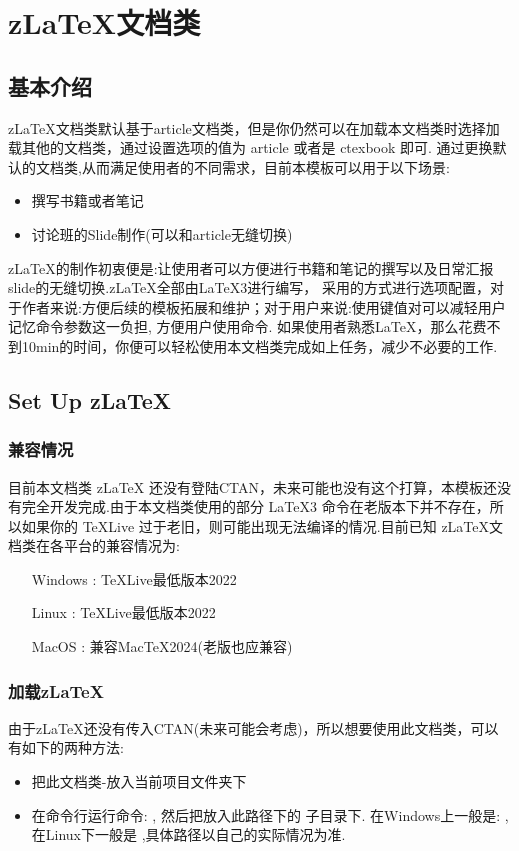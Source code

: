 \chapter{z\LaTeX{}文档类}\label{start-use-class}
\section{基本介绍}
z\LaTeX{}文档类默认基于article文档类，但是你仍然可以在加载本文档类时选择加载其他的文档类，通过设置选项的值为 
article 或者是 ctexbook 即可. 通过更换默认的文档类,从而满足使用者的不同需求，目前本模板可以用于以下场景:
\begin{itemize}
  \item 撰写书籍或者笔记
  \item 讨论班的Slide制作(可以和article无缝切换)
\end{itemize}

z\LaTeX{}的制作初衷便是:让使用者可以方便进行书籍和笔记的撰写以及日常汇报slide的无缝切换.z\LaTeX{}全部由\LaTeX3进行编写，
采用的方式进行选项配置，对于作者来说:方便后续的模板拓展和维护；对于用户来说:使用键值对可以减轻用户记忆命令参数这一负担,
方便用户使用命令. 如果使用者熟悉\LaTeX{}，那么花费不到10min的时间，你便可以轻松使用本文档类完成如上任务，减少不必要的工作.

\section{Set Up z\LaTeX{}}
\subsection{兼容情况}
目前本文档类 z\LaTeX{} 还没有登陆CTAN，未来可能也没有这个打算，本模板还没有完全开发完成.由于本文档类使用的部分
\LaTeX3 命令在老版本下并不存在，所以如果你的 \TeX{}Live 过于老旧，则可能出现无法编译的情况.目前已知
z\LaTeX{}文档类在各平台的兼容情况为:

\hspace*{10em}\parbox{8cm}{
\begin{itemize}
  \item[Windows]: \TeX{}Live最低版本2022
  \item[Linux]: \TeX{}Live最低版本2022
  \item[MacOS]: 兼容Mac{}\TeX{}2024(老版也应兼容) 
\end{itemize}}

\subsection{加载z\LaTeX{}}
由于z\LaTeX{}还没有传入CTAN(未来可能会考虑)，所以想要使用此文档类，可以有如下的两种方法:
\begin{itemize}
    \item 把此文档类-放入当前项目文件夹下
    \item 在命令行运行命令: , 然后把放入此路径下的
        子目录下. 在Windows上一般是: , 在Linux下一般是
        ,具体路径以自己的实际情况为准.
\end{itemize}

